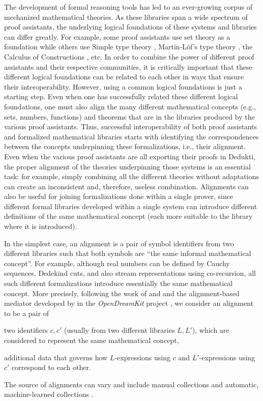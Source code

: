 The development of formal reasoning tools has led to an ever-growing
corpus of mechanized mathematical theories. As these libraries span a
wide spectrum of proof assistants, the underlying logical foundations
of these systems and libraries can differ greatly. For example, some
proof assistants use set theory as a foundation while others use
Simple type theory \cite{Church40}, Martin-L\"of's type theory
\cite{Martin-Lof84}, the Calculus of Constructions
\cite{CoquandHuet88}, etc.  In order to combine the power of different
proof assistants and their respective communities, it is critically
important that these different logical foundations can be related to
each other in ways that ensure their interoperability. However, using
a common logical foundations is just a starting step. Even when one
has successfully related these different logical foundations, one must
also align the many different mathematical concepts (e.g., sets,
numbers, functions) and theorems that are in the libraries produced by
the various proof assistants. Thus, successful interoperability of
both proof assistants and formalized mathematical libraries starts
with identifying the correspondences between the concepts underpinning
these formalizations, i.e., their alignment. Even when the various
proof assistants are all exporting their proofs in Dedukti, the proper
alignment of the theories underpinning those systems is an essential
task: for example, simply combining all the different theories without
adaptations can create an inconsistent and, therefore, useless
combination.
%
Alignments can also be useful for joining formalizations done within a
single prover, since different formal libraries developed within a
single system can introduce different definitions of the same
mathematical concept (each more suitable to the library where it is
introduced).

In the simplest case, an alignment is a pair of symbol identifiers
from two different libraries such that both symbols are ``the same
informal mathematical concept''. For example, although real numbers
can be defined by Cauchy sequences, Dedekind cuts, and also stream
representations using co-recursion, all such different formalizations
introduce essentially the same mathematical concept. More precisely,
following the work of  and 
\cite{GKKMR:alignments:17} and the alignment-based mediator developed
by  in the {\em OpenDreamKit} project \cite{DBLP:conf/mkm/DehayeIKKLMPRTW16}, we
consider an alignment to be a pair of
\begin{compactitem}
  \item two identifiers $c,c'$ (usually from two different libraries
    $L,L'$), which are considered to represent the same mathematical
    concept,
  \item additional data that governs how $L$-expressions using $c$ and
    $L'$-expressions using $c'$ correspond to each other.
\end{compactitem}
The source of alignments can vary and include manual collections
\cite{MRLR:alignments:17} and automatic, machine-learned collections
\cite{GAUTHIER201989}.


